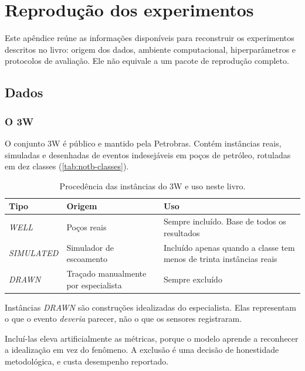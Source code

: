 \chapter{Reprodução dos experimentos}
\label{cap:reproducao}

Este apêndice reúne as informações disponíveis para reconstruir os experimentos
descritos no livro: origem dos dados, ambiente computacional, hiperparâmetros e
protocolos de avaliação. Ele não equivale a um pacote de reprodução completo.

\section{Dados}

\subsection{O 3W}

O conjunto 3W é público e mantido pela Petrobras. Contém instâncias reais, simuladas e
desenhadas de eventos indesejáveis em poços de petróleo, rotuladas em dez classes
(\cref{tab:notb-classes}).

\begin{table}[htbp]
\centering
\caption{Procedência das instâncias do 3W e uso neste livro.}
\label{tab:rep-instancias}
\small
\begin{tabular}{lp{5.0cm}p{4.6cm}}
\toprule
\textbf{Tipo} & \textbf{Origem} & \textbf{Uso} \\
\midrule
\emph{WELL} & Poços reais &
Sempre incluído. Base de todos os resultados \\
\addlinespace
\emph{SIMULATED} & Simulador de escoamento &
Incluído apenas quando a classe tem menos de trinta instâncias reais \\
\addlinespace
\emph{DRAWN} & Traçado manualmente por especialista &
Sempre excluído \\
\bottomrule
\end{tabular}
\end{table}

\begin{destaque}
Instâncias \emph{DRAWN} são construções idealizadas do especialista. Elas representam o
que o evento \emph{deveria} parecer, não o que os sensores registraram.

Incluí-las eleva artificialmente as métricas, porque o modelo aprende a reconhecer a
idealização em vez do fenômeno. A exclusão é uma decisão de honestidade metodológica, e
custa desempenho reportado.
\end{destaque}

